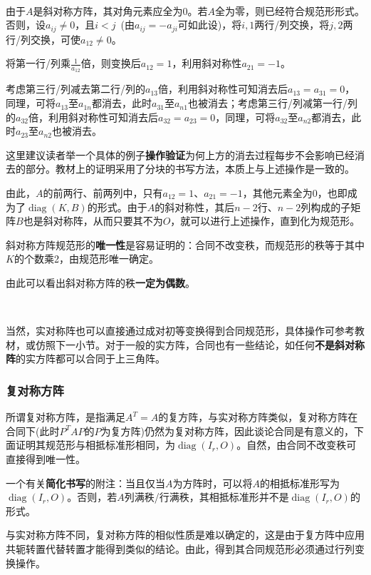 \documentclass[a4paper,UTF8,fontset=windows]{ctexart}
\DeclareMathOperator{\diag}{diag}
\newcommand*{\note}{\noindent *}
\begin{document}
\

由于$A$是斜对称方阵，其对角元素应全为0。若$A$全为零，则已经符合规范形形式。否则，设$a_{ij}\ne0$，且$i<j$\ (由$a_{ij}=-a_{ji}$可如此设)，将$i,1$两行/列交换，将$j,2$两行/列交换，可使$a_{12}\ne0$。

将第一行/列乘$\frac{1}{a_{12}}$倍，则变换后$a_{12}=1$，利用斜对称性$a_{21}=-1$。

考虑第三行/列减去第二行/列的$a_{13}$倍，利用斜对称性可知消去后$a_{13}=a_{31}=0$，同理，可将$a_{13}$至$a_{1n}$都消去，此时$a_{31}$至$a_{n1}$也被消去；考虑第三行/列减第一行/列的$a_{32}$倍，利用斜对称性可知消去后$a_{32}=a_{23}=0$，同理，可将$a_{32}$至$a_{n2}$都消去，此时$a_{23}$至$a_{n2}$也被消去。

\note 这里建议读者举一个具体的例子\textbf{操作验证}为何上方的消去过程每步不会影响已经消去的部分。教材上的证明采用了分块的书写方法，本质上与上述操作是一致的。

由此，$A$的前两行、前两列中，只有$a_{12}=1$、$a_{21}=-1$，其他元素全为0，也即成为了$\diag(K,B)$的形式。由于$A$的斜对称性，其后$n-2$行、$n-2$列构成的子矩阵$B$也是斜对称阵，从而只要其不为$O$，就可以进行上述操作，直到化为规范形。

斜对称方阵规范形的\textbf{唯一性}是容易证明的：合同不改变秩，而规范形的秩等于其中$K$的个数乘2，由规范形唯一确定。

\note 由此可以看出斜对称方阵的秩\textbf{一定为偶数}。

\

\note 当然，实对称阵也可以直接通过成对初等变换得到合同规范形，具体操作可参考教材，或仿照下一小节。对于一般的实方阵，合同也有一些结论，如任何\textbf{不是斜对称阵}的实方阵都可以合同于上三角阵。

\subsubsection{复对称方阵}
所谓复对称方阵，是指满足$A^T=A$的复方阵，与实对称方阵类似，复对称方阵在合同下(此时$P^TAP$的$P$为复方阵)仍然为复对称方阵，因此谈论合同是有意义的，下面证明其规范形与相抵标准形相同，为$\diag(I_r,O)$。自然，由合同不改变秩可直接得到唯一性。

\note 一个有关\textbf{简化书写}的附注：当且仅当$A$为方阵时，可以将$A$的相抵标准形写为$\diag(I_r,O)$。否则，若$A$列满秩/行满秩，其相抵标准形并不是$\diag(I_r,O)$的形式。

\note 与实对称方阵不同，复对称方阵的相似性质是难以确定的，这是由于复方阵中应用共轭转置代替转置才能得到类似的结论。由此，得到其合同规范形必须通过行列变换操作。
\end{document}
